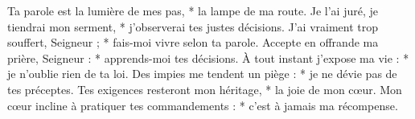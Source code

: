 Ta parole est la lumière de mes pas, *
la lampe de ma route.
\versseparator
Je l’ai juré, je tiendrai mon serment, *
j’observerai tes justes décisions.
\versseparator
J’ai vraiment trop souffert, Seigneur ; *
fais-moi vivre selon ta parole.
\versseparator
Accepte en offrande ma prière, Seigneur : *
apprends-moi tes décisions.
\versseparator
À tout instant j’expose ma vie : *
je n’oublie rien de ta loi.
\versseparator
Des impies me tendent un piège : *
je ne dévie pas de tes préceptes.
\versseparator
Tes exigences resteront mon héritage, *
la joie de mon cœur.
\versseparator
Mon cœur incline à pratiquer tes commandements : *
c’est à jamais ma récompense.
